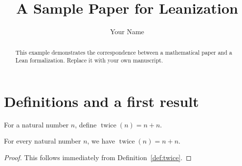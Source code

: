 \documentclass{article}
\title{A Sample Paper for Leanization}
\author{Your Name}
\date{}
\begin{document}
\maketitle
\begin{abstract}
This example demonstrates the correspondence between a mathematical paper
and a Lean formalization. Replace it with your own manuscript.
\end{abstract}
\section{Definitions and a first result}
\begin{definition}\label{def:twice}
For a natural number $n$, define $\operatorname{twice}(n)=n+n$.
\end{definition}
\begin{theorem}\label{thm:expansion}
For every natural number $n$, we have $\operatorname{twice}(n)=n+n$.
\end{theorem}
\begin{proof}
This follows immediately from Definition~\ref{def:twice}.
\end{proof}
\end{document}
